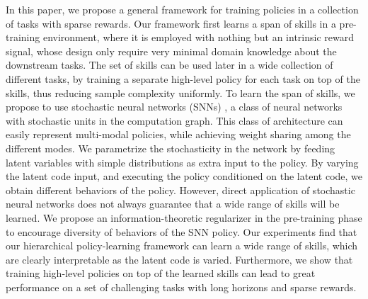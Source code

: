 \documentclass{article} %
\begin{document}
In this paper, we propose a general framework for training policies in a collection of tasks with sparse rewards.
Our framework first learns a span of skills in a pre-training environment, where it is employed with nothing but an intrinsic reward signal, whose design only require very minimal domain knowledge about the downstream tasks.
The set of skills can be used later in a wide collection of different tasks, by training a separate high-level policy for each task on top of the skills, thus reducing sample complexity uniformly.
To learn the span of skills, we propose to use stochastic neural networks (SNNs) \citep{neal1990learning, neal1992connectionist, Tang2014_FSNN}, a class of neural networks with stochastic units in the computation graph.
This class of architecture can easily represent multi-modal policies, while achieving weight sharing among the different modes.
We parametrize the stochasticity in the network by feeding latent variables with simple distributions as extra input to the policy.
By varying the latent code input, and executing the policy conditioned on the latent code, we obtain different behaviors of the policy.
However, direct application of stochastic neural networks does not always guarantee that a wide range of skills will be learned. 
We propose an information-theoretic regularizer in the pre-training phase to encourage diversity of behaviors of the SNN policy.
Our experiments find that our hierarchical policy-learning framework can learn a wide range of skills, which are clearly interpretable as the latent code is varied. Furthermore, we show that training high-level policies on top of the learned skills can lead to great performance on a set of challenging tasks with long horizons and sparse rewards. %




\end{document}
